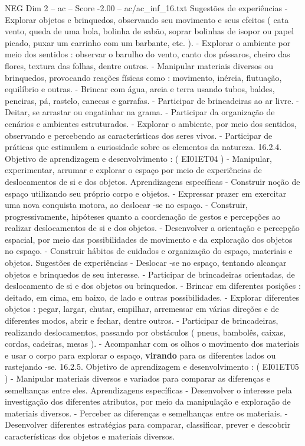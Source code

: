 \begin{textsample}{NEG Dim 2 – ac – Score -2.00 – ac/ac\_inf\_16.txt}
Sugestões de experiências - Explorar objetos e brinquedos, observando seu movimento e seus efeitos ( cata vento, queda de uma bola, bolinha de sabão, soprar bolinhas de isopor ou papel picado, puxar um carrinho com um barbante, etc. ). - Explorar o ambiente por meio dos sentidos : observar o barulho do vento, canto dos pássaros, cheiro das flores, textura das folhas, dentre outros. - Manipular materiais diversos ou brinquedos, provocando reações físicas como : movimento, inércia, flutuação, equilíbrio e outras. - Brincar com água, areia e terra usando tubos, baldes, peneiras, pá, rastelo, canecas e garrafas. - Participar de brincadeiras ao ar livre. - Deitar, se arrastar ou engatinhar na grama. - Participar da organização de cenários e ambientes estruturados. - Explorar o ambiente, por meio dos sentidos, observando e percebendo as características dos seres vivos. - Participar de práticas que estimulem a curiosidade sobre os elementos da natureza. 16.2.4.
Objetivo de aprendizagem e desenvolvimento : ( EI01ET04 ) - Manipular, experimentar, arrumar e explorar o espaço por meio de experiências de deslocamentos de si e dos objetos.
Aprendizagens específicas - Construir noção de espaço utilizando seu próprio corpo e objetos. - Expressar prazer em exercitar uma nova conquista motora, ao deslocar -se no espaço. - Construir, progressivamente, hipóteses quanto a coordenação de gestos e percepções ao realizar deslocamentos de si e dos objetos. - Desenvolver a orientação e percepção espacial, por meio das possibilidades de movimento e da exploração dos objetos no espaço. - Construir hábitos de cuidados e organização do espaço, materiais e objetos.
Sugestões de experiências - Deslocar -se no espaço, tentando alcançar objetos e brinquedos de seu interesse. - Participar de brincadeiras orientadas, de deslocamento de si e dos objetos ou brinquedos. - Brincar em diferentes posições : deitado, em cima, em baixo, de lado e outras possibilidades. - Explorar diferentes objetos : pegar, largar, chutar, empilhar, arremessar em várias direções e de diferentes modos, abrir e fechar, dentre outros. - Participar de brincadeiras, realizando deslocamentos, passando por obstáculos ( pneus, bambolês, caixas, cordas, cadeiras, mesas ). - Acompanhar com os olhos o movimento dos materiais e usar o corpo para explorar o espaço, \textbf{virando} para os diferentes lados ou rastejando -se. 16.2.5.
Objetivo de aprendizagem e desenvolvimento : ( EI01ET05 ) - Manipular materiais diversos e variados para comparar as diferenças e semelhanças entre eles.
Aprendizagens específicas - Desenvolver o interesse pela investigação dos diferentes atributos, por meio da manipulação e exploração de materiais diversos. - Perceber as diferenças e semelhanças entre os materiais. - Desenvolver diferentes estratégias para comparar, classificar, prever e descobrir características dos objetos e materiais diversos.

\end{textsample}

